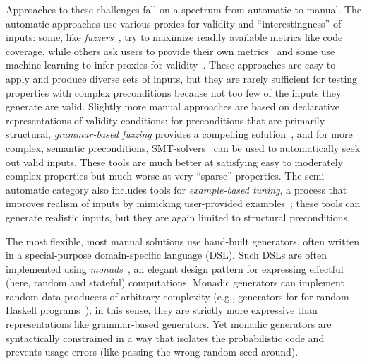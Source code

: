 Approaches to these challenges
fall on a spectrum from automatic to manual. The automatic approaches use
various proxies for validity and ``interestingness'' of
inputs: some, like {\em
fuzzers}~\cite{afl-readme}, try to maximize readily available metrics like code
coverage, while others ask users to provide their own metrics~\cite{loscher2017targetedpbt} and
some use machine learning to infer proxies for
validity~\cite{godefroid2017learn, DBLP:conf/icse/ReddyLPS20}. These approaches
are easy to apply and produce diverse sets of inputs, but they are rarely
sufficient for testing properties with complex
preconditions because not too few of the inputs they generate are valid. Slightly more
manual approaches are based on declarative representations of validity
conditions: for preconditions that are primarily structural, {\em grammar-based
fuzzing} provides a compelling solution~\cite{godefroid2008grammar,
holler2012fuzzing, veggalam2016ifuzzer, wang2019superion,
srivastava2021gramatron}, and for more complex, semantic preconditions,
SMT-solvers~\cite{dewey2017automated, beginners-luck,
steinhofel_input_2022} can be used to automatically seek out valid
inputs. These tools are
much better at satisfying easy to moderately complex properties but
much worse at very ``sparse'' properties. The semi-automatic
category also includes tools for {\em example-based tuning}, a process that
improves realism of inputs by mimicking user-provided
examples~\cite{soremekun2020inputs}; these tools can generate
realistic inputs, but they are again limited to structural preconditions.

The most flexible, most manual solutions use hand-built
generators, often written in a special-purpose domain-specific language (DSL).
Such DSLs are often implemented using {\em
monads\/}~\cite{moggi1991notions}, an elegant design pattern for
expressing effectful (here, random and stateful) computations. Monadic generators can implement random data producers of arbitrary complexity
(e.g., generators for for random Haskell
programs~\cite{palka_testing_2011}); in this sense, they are strictly more expressive than
representations like grammar-based generators.  Yet monadic generators are
syntactically constrained in a way that isolates the probabilistic code and
prevents usage errors (like passing the wrong random seed around).

